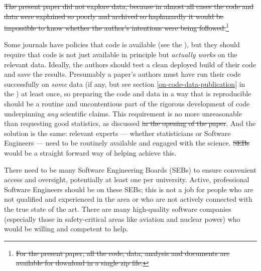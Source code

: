 \documentclass{comjnl}
\providecommand{\DIFadd}[1]{{\protect\color{blue}\uwave{#1}}} %
\providecommand{\DIFdel}[1]{{\protect\color{red}\sout{#1}}}                      %
\providecommand{\DIFaddbegin}{} %
\providecommand{\DIFaddend}{} %
\providecommand{\DIFdelbegin}{} %
\providecommand{\DIFdelend}{} %
\begin{document}
\DIFdelbegin %
\DIFdel{The present paper did not explore data, because in almost all cases the code and data were explained so poorly and archived so haphazardly it would be impossible to know whether the author's intentions were being followed.}\footnote{%
\DIFdel{For the present paper, all the code, data, analysis and documents are available for download in a single zip file.}%
} %
\addtocounter{footnote}{-1}%
\DIFdelend Some journals have policies that code is available (see the \supplement), but they should require that code is not just available in principle but \emph{actually works\/} on the relevant data. Ideally, the authors should test a clean deployed build of their code and save the results. Presumably a paper's authors must have run their code successfully on \emph{some\/} data (if any, but see section \ref{on-code-data-publication} in the \supplement) at least once, so preparing the code and data in a way that is reproducible should be a routine and uncontentious part of the rigorous development of  code underpinning \emph{any\/} scientific claims. This requirement is no more unreasonable than requesting good statistics, as discussed \DIFdelbegin \DIFdel{in the opening of the paper}\DIFdelend \DIFaddbegin \DIFadd{earlier}\DIFaddend . And the solution is the same: relevant experts --- whether statisticians or Software Engineers --- need to be routinely available and engaged with the science. \DIFdelbegin \DIFdel{SEBs }\DIFdelend \DIFaddbegin \DIFadd{Software Engineering Boards }\DIFaddend would be a straight forward way of helping achieve this.
\DIFdelbegin %
\DIFdelend 

There need to be many Software Engineering Boards (SEBs) to ensure convenient access and oversight, potentially at least one per university. Active, professional Software Engineers should be on these SEBs; this is not a job for people who are not qualified and experienced in the area or who are not actively connected with the true state of the art. There are many high-quality software companies (especially those in safety-critical areas like aviation and nuclear power) who would be willing and competent to help.
\end{document}

